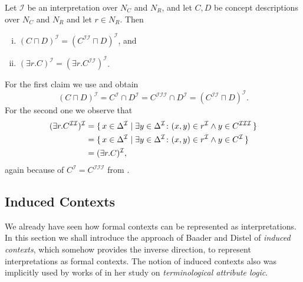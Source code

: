 \begin{Proposition}
  \label{prop:double-II-under-I}
  Let $\mathcal{I}$ be an interpretation over $N_C$ and $N_R$, and let $C, D$ be \ELgfpbot
  concept descriptions over $N_C$ and $N_R$ and let $r \in N_R$.  Then
  \begin{enumerate}[i. ]
  \item $(C \sqcap D)^{\mathcal{I}} = (C^{\mathcal{I}\mathcal{I}} \sqcap
    D)^{\mathcal{I}}$, and
  \item $(\exists r. C)^{\mathcal{I}} = (\exists r. C^{\mathcal{I}\mathcal{I}})^{\mathcal{I}}$.
  \end{enumerate}
\end{Proposition}
\begin{Proof}
  For the first claim we use  and obtain
  \begin{equation*}
    (C \sqcap D)^{\mathcal{I}} = C^{\mathcal{I}} \cap D^{\mathcal{I}} =
    C^{\mathcal{I}\mathcal{I}\mathcal{I}} \cap D^{\mathcal{I}} =
    (C^{\mathcal{I}\mathcal{I}} \sqcap D)^{\mathcal{I}}.
  \end{equation*}
  For the second one we observe that
  \begin{align*}
    (\exists r. C^{\mathcal{I}\mathcal{I}})^{\mathcal{I}}
    &= {\{\, x \in \Delta^{\mathcal{I}} \mid \exists y \in \Delta^{\mathcal{I}} \colon (x, y)
      \in r^{\mathcal{I}} \wedge y \in C^{\mathcal{I}\mathcal{I}\mathcal{I}} \,\}}\\
    &= {\{\, x \in \Delta^{\mathcal{I}} \mid \exists y \in \Delta^{\mathcal{I}} \colon (x, y)
      \in r^{\mathcal{I}} \wedge y \in C^{\mathcal{I}} \,\}} \\
    &= (\exists r. C)^{\mathcal{I}},
  \end{align*}
  again because of $C^{\mathcal{I}} = C^{\mathcal{I}\mathcal{I}\mathcal{I}}$ from
  .
\end{Proof}


\subsection{Induced Contexts}
\label{sec:induced-contexts}

We already have seen how formal contexts can be represented as interpretations.  In this
section we shall introduce the approach of Baader and Distel of \emph{induced contexts},
which somehow provides the inverse direction, \ie to represent interpretations as formal
contexts.  The notion of induced contexts also was implicitly used by works of
\textcite{books/math/Prediger00} in her study on \emph{terminological attribute logic}.

